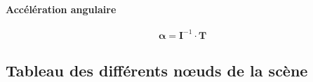     \paragraph{Accélération angulaire}

    \begin{equation}
    \mathbf{\alpha} = \mathbf{I}^{-1} \cdot \mathbf{T}
    \end{equation}

\subsection{Tableau des différents n\oe{}uds de la scène}
    \renewcommand{\arraystretch}{1.2}
    \setlength{\tabcolsep}{10pt}

